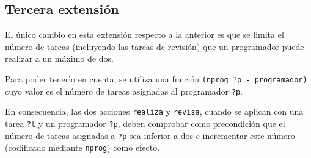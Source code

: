 
\subsection{Tercera extensión} \label{sec:mod-ext3}

El único cambio en esta extensión respecto a la anterior es que se limita el 
número de tareas (incluyendo las tareas de revisión) que un programador puede 
realizar a un máximo de dos. 

Para poder tenerlo en cuenta, se utiliza una función 
\texttt{(nprog ?p - programador)} cuyo valor es el número de tareas asignadas 
al programador \texttt{?p}. 

En consecuencia, las dos acciones \texttt{realiza} y \texttt{revisa}, cuando 
se aplican con una tarea \texttt{?t} y un programador \texttt{?p}, deben 
comprobar como precondición que el número de tareas asignadas a \texttt{?p} 
sea inferior a dos e incrementar este número (codificado mediante 
\texttt{nprog}) como efecto.

